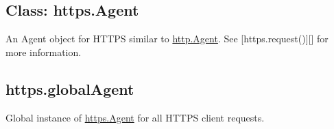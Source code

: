 \subsection{Class: https.Agent}

An Agent object for HTTPS similar to
\href{http.html\#http\_class\_http\_agent}{http.Agent}. See
{[}https.request(){]}{[}{]} for more information.

\subsection{https.globalAgent}

Global instance of \hyperref[https_class_https_agent]{https.Agent}
for all HTTPS client requests.
